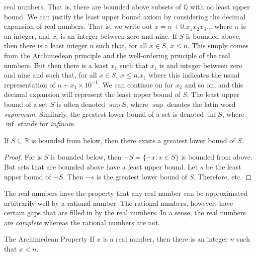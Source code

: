 \documentclass[crop=false,class=book,oneside]{standalone}
\begin{document}
            real numbers. That is, there are bounded above subsets
            of $\mathbb{Q}$ with no least upper bound.
            We can justify the least upper bound axiom by
            considering the decimal expansion of real numbers. That
            is, we write out
            $x=n+0.x_{1}x_{2}x_{3}\dots$ where $n$ is an integer,
            and $x_{i}$ is an integer between zero and nine. If
            $S$ is bounded above, then there is a least integer
            $n$ such that, for all $x\in{S}$, $x\leq{n}$. This
            simply comes from the Archimedean principle and the
            well-ordering principle of the real numbers.
            But then there is a least $x_{1}$ such that $x_{1}$ is
            and integer between zero and nine and such that, for
            all $x\in{S}$, $x\leq{n}.x_{1}$ where this indicates
            the usual representation of
            $n+x_{1}\times{10}^{\minus{1}}$. We can continue on
            for $x_{2}$ and so on, and this decimal expansion
            will represent the least upper bound of $S$. The
            least upper bound of a set $S$ is often denoted
            $\sup{S}$, where $\sup$ denotes the latin word
            \textit{supremum}. Similarly, the greatest lower bound
            of a set is denoted $\inf{S}$, where $\inf$ stands
            for \textit{infinum}.
            \begin{theorem}
                If $S\subseteq\mathbb{R}$ is bounded from below,
                then there exists a greatest lower bound of $S$.
            \end{theorem}
            \begin{proof}
                For is $S$ is bounded below, then
                $\minus{S}=\{\minus{x}:x\in{S}\}$ is bounded
                from above. But sets that are bounded above have
                a least upper bound. Let $s$ be the least upper
                bound of $\minus{S}$. Then $\minus{s}$ is the
                greatest lower bound of $S$. Therefore, etc.
            \end{proof}
            The real numbers have the property that any real
            number can be approximated arbitrarily well by a
            rational number. The rational numbers, however, have
            certain gaps that are filled in by the real numbers.
            In a sense, the real numbers are \textit{complete}
            whereas the rational numbers are not.
            \begin{ltheorem}{The Archimedean Property}
                If $x$ is a real number, then there is an integer
                $n$ such that $x<n$.
            \end{ltheorem}
\end{document}
